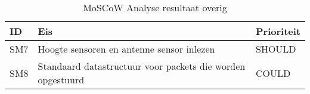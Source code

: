 \begin{table}[h!]

\centering
	\caption{MoSCoW Analyse resultaat overig}
	\label{tab:shouldetc}
	\begin{tabular}{lp{13cm}l}
	\toprule
	\textbf{ID} & \textbf{Eis} & \textbf{Prioriteit}\\ \midrule
	SM7			& Hoogte sensoren en antenne sensor inlezen 				 & SHOULD \\  \midrule
	SM8			& Standaard datastructuur voor packets die worden opgestuurd & COULD	 \\\bottomrule
	\end{tabular}
\end{table}


